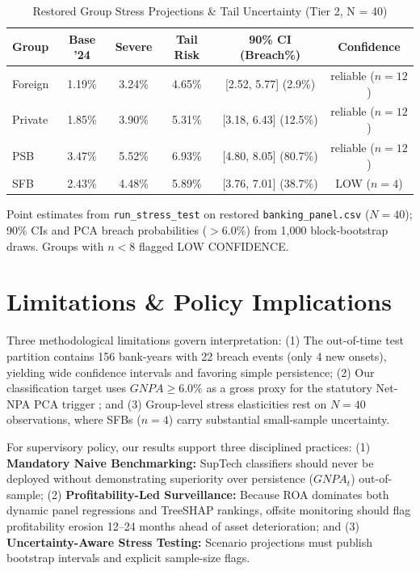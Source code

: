 \documentclass[conference]{IEEEtran}
\begin{document}
\begin{table}[htbp]
\caption{Restored Group Stress Projections \& Tail Uncertainty (Tier 2, N = 40)}
\begin{center}
\begin{tabular}{lccccc}
\toprule
\textbf{Group} & \textbf{Base '24} & \textbf{Severe} & \textbf{Tail Risk} & \textbf{90\% CI (Breach\%)} & \textbf{Confidence} \\
\midrule
Foreign & 1.19\% & 3.24\% & 4.65\% & [2.52, 5.77] (2.9\%) & reliable ($n=12$) \\
Private & 1.85\% & 3.90\% & 5.31\% & [3.18, 6.43] (12.5\%) & reliable ($n=12$) \\
PSB & 3.47\% & 5.52\% & 6.93\% & [4.80, 8.05] (80.7\%) & reliable ($n=12$) \\
SFB & 2.43\% & 4.48\% & 5.89\% & [3.76, 7.01] (38.7\%) & LOW ($n=4$) \\
\bottomrule
\end{tabular}
\end{center}
\vspace{-1mm}
\footnotesize{Point estimates from \texttt{run\_stress\_test} on restored \texttt{banking\_panel.csv} ($N=40$); 90\% CIs and PCA breach probabilities ($>6.0\%$) from 1,000 block-bootstrap draws. Groups with $n < 8$ flagged LOW CONFIDENCE.}
\label{tab:stress}
\end{table}

\section{Limitations \& Policy Implications}
Three methodological limitations govern interpretation: (1) The out-of-time test partition contains 156 bank-years with 22 breach events (only 4 new onsets), yielding wide confidence intervals and favoring simple persistence; (2) Our classification target uses $GNPA \ge 6.0\%$ as a gross proxy for the statutory Net-NPA PCA trigger \cite{rbi_pca2021}; and (3) Group-level stress elasticities rest on $N = 40$ observations, where SFBs ($n = 4$) carry substantial small-sample uncertainty.

For supervisory policy, our results support three disciplined practices:
(1) \textbf{Mandatory Naive Benchmarking:} SupTech classifiers should never be deployed without demonstrating superiority over persistence ($GNPA_t$) out-of-sample;
(2) \textbf{Profitability-Led Surveillance:} Because ROA dominates both dynamic panel regressions and TreeSHAP rankings, offsite monitoring should flag profitability erosion 12--24 months ahead of asset deterioration; and
(3) \textbf{Uncertainty-Aware Stress Testing:} Scenario projections must publish bootstrap intervals and explicit sample-size flags.
\end{document}
